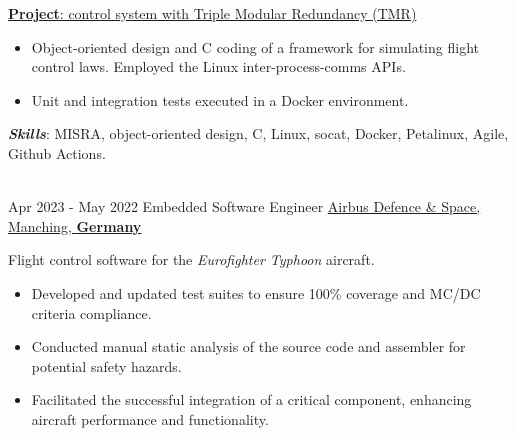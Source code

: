 \documentclass[letterpaper]{twentysecondcv} %
\begin{document}
\begin{twenty}
{            \vspace{2 mm}
            \underline{\textbf{Project}: control system with Triple Modular Redundancy (TMR)}

            \vspace{2 mm}
            \begin{itemize}
                \item Object-oriented design and C coding of a framework for simulating flight control laws. Employed the Linux inter-process-comms APIs.
                \item Unit and integration tests executed in a Docker environment.
            \end{itemize}

            \vspace{2 mm}
            \textbf{\textit{Skills}}: MISRA, object-oriented design, C, Linux, socat, Docker, Petalinux, Agile, Github Actions.
        }\\
    \twentyitem
        {Apr 2023 -}
        {May 2022}
        {Embedded Software Engineer}
        {\href{https://www.airbus.com/en/who-we-are}{Airbus Defence \& Space, Manching, \textbf{Germany}}}
        {}
        {
            Flight control software for the \textit{Eurofighter Typhoon} aircraft.
            \vspace{1 mm}
            \begin{itemize}
                \item Developed and updated test suites to ensure 100\% coverage and MC/DC criteria compliance.
                \item Conducted manual static analysis of the source code and assembler for potential safety hazards.
                \item Facilitated the successful integration of a critical component, enhancing aircraft performance and functionality.
            \end{itemize}

}
\end{twenty}
\end{document}
